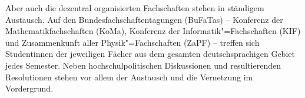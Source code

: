 Aber auch die dezentral organisierten Fachschaften stehen in ständigem Austausch.
Auf den Bundesfachschaftentagungen (BuFaTas) -- Konferenz der Mathematikfachschaften (KoMa), Konferenz der Informatik"=Fachschaften (KIF) und Zusammenkunft aller Physik"=Fachschaften (ZaPF) -- treffen sich Studentinnen der jeweiligen Fächer aus dem gesamten deutschsprachigen Gebiet jedes Semester.
Neben hochschulpolitischen Diskussionen und resultierenden Resolutionen stehen vor allem der Austausch und die Vernetzung im Vordergrund.

\vfill \eject

